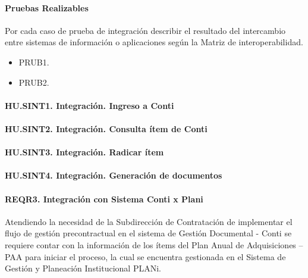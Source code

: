 \documentclass[
  paper=a4,
  ,captions=tableheading
]{scrartcl}
\providecommand{\tightlist}{%
  \setlength{\itemsep}{0pt}\setlength{\parskip}{0pt}}
\begin{document}
\paragraph{Pruebas Realizables}\label{sec:pruebas-realizables-3}

Por cada caso de prueba de integración describir el resultado del
intercambio entre sistemas de información o aplicaciones según la Matriz
de interoperabilidad.

\begin{itemize}
\tightlist
\item
  PRUB1.
\item
  PRUB2.
\end{itemize}

\paragraph{HU.SINT1. Integración. Ingreso a
Conti}\label{sec:hu.sint1.-integraciuxf3n.-ingreso-a-conti}

\paragraph{HU.SINT2. Integración. Consulta ítem de
Conti}\label{sec:hu.sint2.-integraciuxf3n.-consulta-uxedtem-de-conti}

\paragraph{HU.SINT3. Integración. Radicar
ítem}\label{sec:hu.sint3.-integraciuxf3n.-radicar-uxedtem}

\paragraph{HU.SINT4. Integración. Generación de
documentos}\label{sec:hu.sint4.-integraciuxf3n.-generaciuxf3n-de-documentos}

\paragraph{REQR3. Integración con Sistema Conti x
Plani}\label{sec:reqr3.-integraciuxf3n-con-sistema-conti-x-plani}

Atendiendo la necesidad de la Subdirección de Contratación de
implementar el flujo de gestión precontractual en el sistema de Gestión
Documental - Conti se requiere contar con la información de los ítems
del Plan Anual de Adquisiciones -- PAA para iniciar el proceso, la cual
se encuentra gestionada en el Sistema de Gestión y Planeación
Institucional PLANi.
\end{document}
